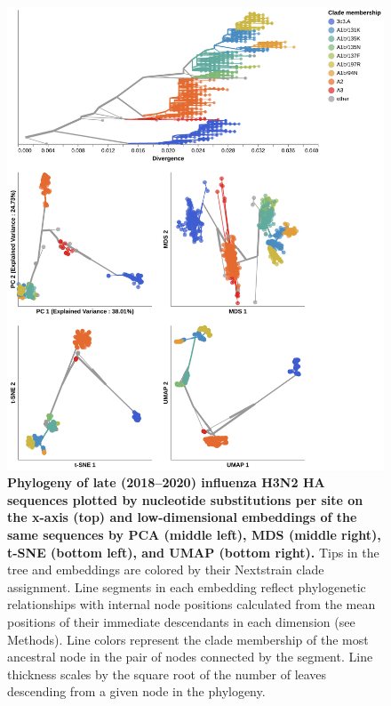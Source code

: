 \begin{figure}[!h]
\includegraphics[width=\columnwidth]{figures/flu-2018-2020-ha-embeddings-by-clade.png}
\caption{{\bf Phylogeny of late (2018--2020) influenza H3N2 HA sequences plotted by nucleotide substitutions per site on the x-axis (top) and low-dimensional embeddings of the same sequences by PCA (middle left), MDS (middle right), t-SNE (bottom left), and UMAP (bottom right).}
Tips in the tree and embeddings are colored by their Nextstrain clade assignment.
Line segments in each embedding reflect phylogenetic relationships with internal node positions calculated from the mean positions of their immediate descendants in each dimension (see Methods).
Line colors represent the clade membership of the most ancestral node in the pair of nodes connected by the segment.
Line thickness scales by the square root of the number of leaves descending from a given node in the phylogeny.}\label{S_Fig_late_flu_embeddings_by_clade}
\end{figure}

